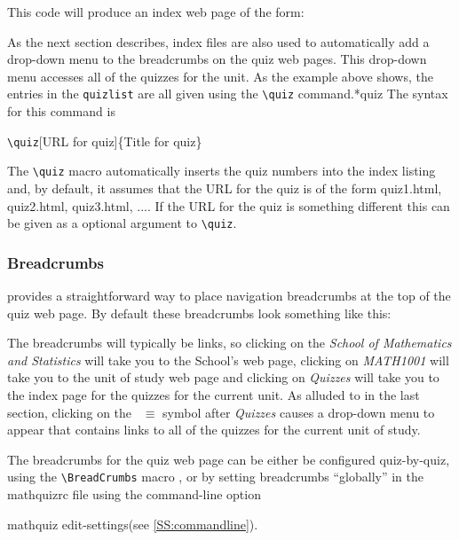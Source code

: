 \documentclass[svgnames]{article}
\makeatletter
\newcommand\macroIndex[1]{%
  \lowercase{\def\temp{#1}}%
  \expandafter\index\expandafter{\temp@\textbackslash#1}%
}
\newcommand\ddash{\texttt{\textemdash\textemdash}}
\newcommand\mathquizopt[1]{\textsf{mathquiz \ddash#1}}
\newcommand\mathquizrc{\index{mathquizrc}\textsf{mathquizrc}\xspace}
\makeatother
\begin{document}
  This code will produce an index web page of the form:


  As the next section describes, index files are also used to
  automatically add a drop-down menu to the breadcrumbs on the quiz web
  pages. This drop-down menu accesses all of the quizzes for the unit.
  As the example above shows, the entries in the \Verb|quizlist| are all
  given using the \Verb|\quiz| command.*{quiz} The syntax for this command is

  \begin{center}
      \Verb|\quiz|[URL for quiz]\{Title for quiz\}
  \end{center}

  \noindent
  The \Verb|\quiz| macro automatically inserts the quiz numbers
  into the index listing and, by default, it assumes that the URL for the quiz
  is of the form \textsf{quiz1.html}, \textsf{quiz2.html},
  \textsf{quiz3.html}, .... If the URL for the quiz is something
  different this can be given as a optional argument to \Verb|\quiz|.

  \subsubsection{Breadcrumbs}\label{SS:breadcrumbs}

  \MathQuiz provides a straightforward way to place navigation breadcrumbs
  at the top of the quiz web page. By default these
  breadcrumbs look something like this:


  \noindent
  The breadcrumbs will typically be links, so clicking on the
  \textit{School of Mathematics and Statistics} will take you to the
  School's web page, clicking on \textit{MATH1001} will take you to the
  unit of study web page and clicking on \textit{Quizzes} will take you
  to the index page for the quizzes for the current unit. As alluded to
  in the last section, clicking on the~{\large\color{red} $\equiv$} symbol after
  \textit{Quizzes} causes a drop-down menu to appear that
  contains links to all of the quizzes for the current unit of study.


  \noindent
  The breadcrumbs for the quiz web page can be either be configured quiz-by-quiz, using the
  \Verb|\BreadCrumbs| macro \macroIndex{BreadCrumbs}, or by setting \textsf{breadcrumbs} ``globally'' in the
  \mathquizrc file using the command-line option
  \begin{center}
        \mathquizopt{edit-settings}\qquad (see \autoref{SS:commandline}).
  \end{center}
\end{document}
